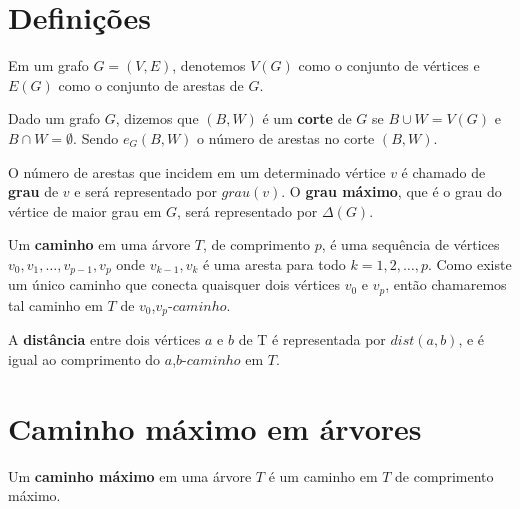 \documentclass[a4paper,12pt]{article}
\begin{document}
\newpage


\section{Definições}
		
	 Em um grafo $G =(V,E)$, denotemos $V(G)$
	como o conjunto de vértices e 
	$E(G)$ como o conjunto de arestas de $G$.

	\bigskip

	Dado um grafo $G$, dizemos que $(B,W)$ é um 
	\textbf{corte}
	de $G$ se $B \cup W = V(G)$ e $B \cap W = \emptyset$.
	Sendo $e_G(B,W)$ o número de arestas no corte $(B,W)$.

	\bigskip

	O número de arestas que incidem em um determinado
	vértice $v$ é chamado de 
	\textbf{grau} de $v$ e será representado
	por $grau(v)$. O 
	\textbf{grau máximo}, que é o grau do vértice de
	maior grau em $G$, será representado por $\Delta(G)$.

	\bigskip

	Um \textbf{caminho} em uma árvore $T$, de 
	comprimento $p$, é uma sequência de vértices 
	$v_0, v_1, \ldots,v_{p-1}, v_p$ 
	onde {$v_{k-1}, v_k$} é uma aresta para todo 
	$k = 1,2, \ldots, p$. 
	Como existe um único caminho que conecta quaisquer dois 
	vértices $v_0$ e $v_p$, então chamaremos tal caminho em $T$
	de  
	$v_0$,$v_p$-$caminho$.

	\bigskip

	A \textbf{distância} entre dois vértices $a$ e 
	$b$ de T é representada por 
	$dist(a,b)$, e é igual ao comprimento do
	$a$,$b$-$caminho$ em $T$.

		

\newpage



\section{Caminho máximo em árvores}

	Um \textbf{caminho máximo} em uma árvore $T$ é um caminho em 
	$T$ de comprimento máximo.
\end{document}
